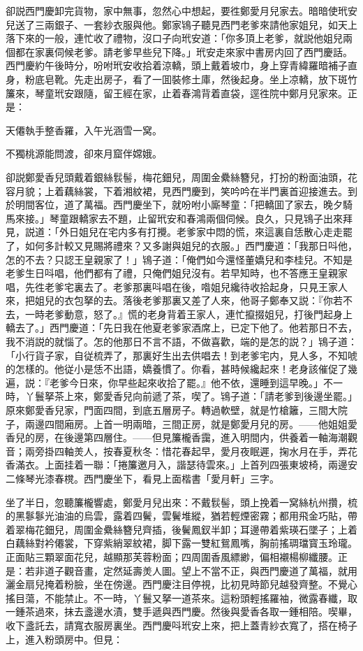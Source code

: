 卻説西門慶卸完貨物，家中無事，忽然心中想起，要徃鄭愛月兒家去。暗暗使玳安兒送了三兩銀子、一套紗衣服與他。鄭家鴇子聽見西門老爹來請他家姐兒，如天上落下來的一般，連忙收了禮物，沒口子向玳安道：「你多頂上老爹，就説他姐兒兩個都在家裏伺候老爹。請老爹早些兒下降。」玳安走來家中書房内回了西門慶話。西門慶約午後時分，吩咐玳安收拾着涼轎，頭上戴着坡巾，身上穿青緯羅暗補子直身，粉底皂靴。先走出房子，看了一囬裝修土庫，然後起身。坐上凉轎，放下斑竹簾來，琴童玳安跟隨，留王經在家，止着春鴻背着直袋，逕徃院中鄭月兒家來。正是：

\begin{myquote}
天僊執手整香羅，入午光涵雪一窝。

不獨桃源能問渡，卻來月窟伴嫦娥。
\end{myquote}

卻説鄭愛香兒頭戴着銀絲䯼髻，梅花鈿兒，周圍金纍絲簪兒，打扮的粉面油頭，花容月貌；上着藕絲裳，下着湘紋裙，見西門慶到，笑吟吟在半門裏首迎接進去。到於明間客位，道了萬福。西門慶坐下，就吩咐小廝琴童：「把轎囬了家去，晚夕騎馬來接。」琴童跟轎家去不題，止留玳安和春鴻兩個伺候。良久，只見鴇子出來拜見，説道：「外日姐兒在宅内多有打攪。老爹家中悶的慌，來這裏自恁散心走走罷了，如何多計較又見賜將禮來？又多謝與姐兒的衣服。」西門慶道：「我那日呌他，怎的不去？只認王皇親家了！」鴇子道：「俺們如今還怪董嬌兒和李桂兒。不知是老爹生日呌唱，他們都有了禮，只俺們姐兒沒有。若早知時，也不答應王皇親家唱，先徃老爹宅裏去了。老爹那裏呌唱在後，喒姐兒纔待收拾起身，只見王家人來，把姐兒的衣包拏的去。落後老爹那裏又差了人來，他哥子鄭奉又説：『你若不去，一時老爹動意，怒了。』慌的老身背着王家人，連忙攛掇姐兒，打後門起身上轎去了。」西門慶道：「先日我在他夏老爹家酒席上，已定下他了。他若那日不去，我不消説的就惱了。怎的他那日不言不語，不做喜歡，端的是怎的説？」鴇子道：「小行貨子家，自従梳弄了，那裏好生出去供唱去！到老爹宅内，見人多，不知唬的怎樣的。他従小是恁不出語，嬌養慣了。你看，甚時候纔起來！老身該催促了幾遍，説：『老爹今日來，你早些起來收拾了罷。』他不依，還睡到這早晚。」不一時，丫鬟拏茶上來，鄭愛香兒向前遞了茶，喫了。鴇子道：「請老爹到後邊坐罷。」原來鄭愛香兒家，門面四間，到底五層房子。轉過軟壁，就是竹槍籬，三間大院子，兩邊四間廂房。上首一明兩暗，三間正房，就是鄭愛月兒的房。——他姐姐愛香兒的房，在後邊第四層住。——但見簾櫳香靄，進入明間内，供養着一軸海潮觀音；兩旁掛四軸羙人，按春夏秋冬：惜花春起早，愛月夜眠遲，掬水月在手，弄花香滿衣。上面挂着一聯：「捲簾邀月入，諧瑟待雲來。」上首列四張東坡椅，兩邊安二條琴光漆春櫈。西門慶坐下，看見上面楷書「愛月軒」三字。

坐了半日，忽聽簾櫳響處，鄭愛月兒出來：不戴䯼髻，頭上挽着一窝絲杭州攢，梳的黑鬖鬖光油油的烏雲，露着四鬢，雲鬢堆縱，猶若輕煙密霧；都用飛金巧貼，帶着翠梅花鈿兒，周圍金纍絲簪兒齊插，後鬢鳳釵半卸；耳邊帶着紫瑛石墜子；上着白藕絲對衿僊裳，下穿紫綃翠紋裙，脚下露一雙紅鴛鳳嘴，胸前搖琱璫寳玉玲瓏。正面貼三顆翠面花兒，越顯那芙蓉粉面；四周圍香風縹緲，偏相襯楊柳纖腰。正是：若非道子觀音畫，定然延壽羙人圖。望上不當不正，與西門慶道了萬福，就用灑金扇兒掩着粉臉，坐在傍邊。西門慶注目停視，比初見時節兒越發齊整。不覺心搖目蕩，不能禁止。不一時，丫鬟又拏一道茶來。這粉頭輕搖羅袖，微露春纖，取一鍾茶過來，抹去盞邊水漬，雙手遞與西門慶。然後與愛香各取一鍾相陪。喫畢，收下盞託去，請寬衣服房裏坐。西門慶呌玳安上來，把上蓋青紗衣寬了，搭在椅子上，進入粉頭房中。但見：

